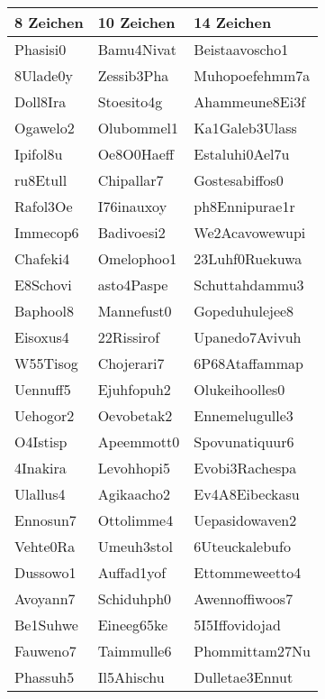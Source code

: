 \documentclass[a4paper,10pt,ngerman]{scrartcl}
\begin{document}
\begin{center}
\begin{longtable}{l|l|l}
\textbf{8 Zeichen} & \textbf{10 Zeichen} & \textbf{14 Zeichen}\\
\hline
    Phasisi0  &  Bamu4Nivat  & Beistaavoscho1 \\
    8Ulade0y  &  Zessib3Pha  & Muhopoefehmm7a \\
    Doll8Ira  &  Stoesito4g  & Ahammeune8Ei3f \\
    Ogawelo2  &  Olubommel1  & Ka1Galeb3Ulass \\
    Ipifol8u  &  Oe8O0Haeff  & Estaluhi0Ael7u \\
    ru8Etull  &  Chipallar7  & Gostesabiffos0 \\
    Rafol3Oe & I76inauxoy & ph8Ennipurae1r \\
    Immecop6 & Badivoesi2 & We2Acavowewupi \\
    Chafeki4 & Omelophoo1 & 23Luhf0Ruekuwa \\
    E8Schovi & asto4Paspe & Schuttahdammu3 \\
    Baphool8 & Mannefust0 & Gopeduhulejee8 \\
    Eisoxus4 & 22Rissirof & Upanedo7Avivuh \\
    W55Tisog & Chojerari7 & 6P68Ataffammap \\
    Uennuff5 & Ejuhfopuh2 & Olukeihoolles0 \\
    Uehogor2 & Oevobetak2 & Ennemelugulle3 \\
    O4Istisp & Apeemmott0 & Spovunatiquur6 \\
    4Inakira & Levohhopi5 & Evobi3Rachespa \\
    Ulallus4 & Agikaacho2 & Ev4A8Eibeckasu \\
    Ennosun7 & Ottolimme4 & Uepasidowaven2 \\
    Vehte0Ra & Umeuh3stol & 6Uteuckalebufo \\
    Dussowo1 & Auffad1yof & Ettommeweetto4 \\
    Avoyann7 & Schiduhph0 & Awennoffiwoos7 \\
    Be1Suhwe & Eineeg65ke & 5I5Iffovidojad \\
    Fauweno7 & Taimmulle6 & Phommittam27Nu \\
    Phassuh5 & Il5Ahischu & Dulletae3Ennut \\
\end{longtable}
\end{center}
\end{document}
